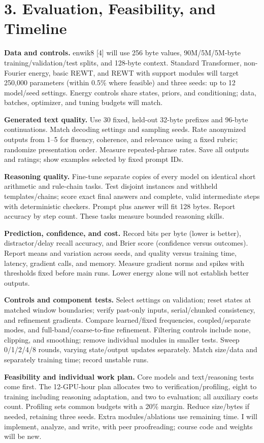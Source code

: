 \documentclass[11pt,letterpaper]{article}
\begin{document}
\newpage
\section*{3. Evaluation, Feasibility, and Timeline}

\textbf{Data and controls.} enwik8 [4] will use 256 byte values, 90M/5M/5M-byte training/validation/test splits, and 128-byte context. Standard Transformer, non-Fourier energy, basic REWT, and REWT with support modules will target 250,000 parameters (within 0.5\% where feasible) and three seeds: up to 12 model/seed settings. Energy controls share states, priors, and conditioning; data, batches, optimizer, and tuning budgets will match.

\textbf{Generated text quality.} Use 30 fixed, held-out 32-byte prefixes and 96-byte continuations. Match decoding settings and sampling seeds. Rate anonymized outputs from 1–5 for fluency, coherence, and relevance using a fixed rubric; randomize presentation order. Measure repeated-phrase rates. Save all outputs and ratings; show examples selected by fixed prompt IDs.

\textbf{Reasoning quality.} Fine-tune separate copies of every model on identical short arithmetic and rule-chain tasks. Test disjoint instances and withheld templates/chains; score exact final answers and complete, valid intermediate steps with deterministic checkers. Prompt plus answer will fit 128 bytes. Report accuracy by step count. These tasks measure bounded reasoning skills.

\textbf{Prediction, confidence, and cost.} Record bits per byte (lower is better), distractor/delay recall accuracy, and Brier score (confidence versus outcomes). Report means and variation across seeds, and quality versus training time, latency, gradient calls, and memory. Measure gradient norms and spikes with thresholds fixed before main runs. Lower energy alone will not establish better outputs.

\textbf{Controls and component tests.} Select settings on validation; reset states at matched window boundaries; verify past-only inputs, serial/chunked consistency, and refinement gradients. Compare learned/fixed frequencies, coupled/separate modes, and full-band/coarse-to-fine refinement. Filtering controls include none, clipping, and smoothing; remove individual modules in smaller tests. Sweep 0/1/2/4/8 rounds, varying state/output updates separately. Match size/data and separately training time; record unstable runs.

\textbf{Feasibility and individual work plan.} Core models and text/reasoning tests come first. The 12-GPU-hour plan allocates two to verification/profiling, eight to training including reasoning adaptation, and two to evaluation; all auxiliary costs count. Profiling sets common budgets with a 20\% margin. Reduce size/bytes if needed, retaining three seeds. Extra modules/ablations use remaining time. I will implement, analyze, and write, with peer proofreading; course code and weights will be new.
\end{document}
